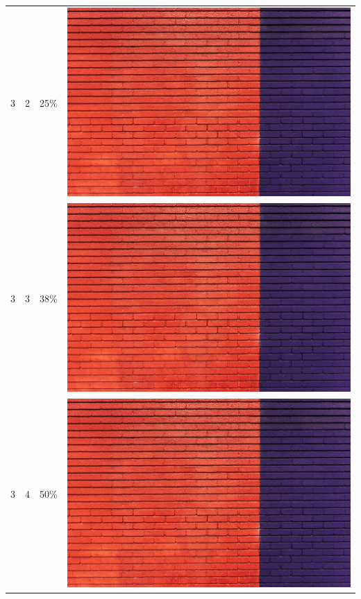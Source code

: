 \documentclass[times, utf8, seminar]{fer}
\begin{document}
\begin{center}
\begin{longtable}{|c|c|c|c|}
3 & 2 &25\% & \includegraphics[scale=0.3]{../benchmark_results/pattern/3_components-2_bits.png} \\
3 & 3 &38\% & \includegraphics[scale=0.3]{../benchmark_results/pattern/3_components-3_bits.png} \\
3 & 4 &50\% & \includegraphics[scale=0.3]{../benchmark_results/pattern/3_components-4_bits.png} \\

\end{longtable}
\end{center}
\end{document}
